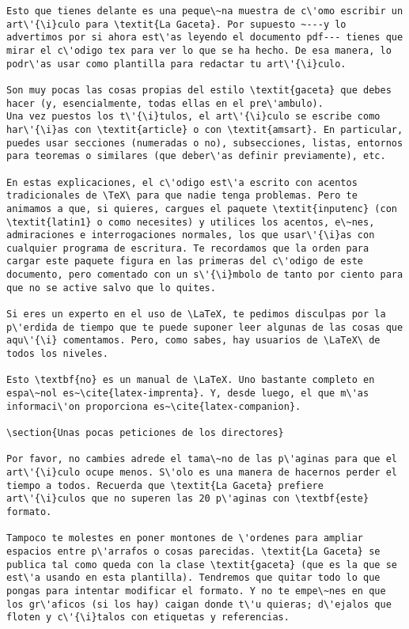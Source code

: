 \documentclass[11pt, a4paper]{article}
\begin{document}
\begin{lstlisting}
Esto que tienes delante es una peque\~na muestra de c\'omo escribir un art\'{\i}culo para \textit{La Gaceta}. Por supuesto ~---y lo advertimos por si ahora est\'as leyendo el documento pdf--- tienes que mirar el c\'odigo tex para ver lo que se ha hecho. De esa manera, lo podr\'as usar como plantilla para redactar tu art\'{\i}culo.

Son muy pocas las cosas propias del estilo \textit{gaceta} que debes hacer (y, esencialmente, todas ellas en el pre\'ambulo).
Una vez puestos los t\'{\i}tulos, el art\'{\i}culo se escribe como har\'{\i}as con \textit{article} o con \textit{amsart}. En particular, puedes usar secciones (numeradas o no), subsecciones, listas, entornos para teoremas o similares (que deber\'as definir previamente), etc.

En estas explicaciones, el c\'odigo est\'a escrito con acentos tradicionales de \TeX\ para que nadie tenga problemas. Pero te animamos a que, si quieres, cargues el paquete \textit{inputenc} (con \textit{latin1} o como necesites) y utilices los acentos, e\~nes, admiraciones e interrogaciones normales, los que usar\'{\i}as con cualquier programa de escritura. Te recordamos que la orden para cargar este paquete figura en las primeras del c\'odigo de este documento, pero comentado con un s\'{\i}mbolo de tanto por ciento para que no se active salvo que lo quites.

Si eres un experto en el uso de \LaTeX, te pedimos disculpas por la p\'erdida de tiempo que te puede suponer leer algunas de las cosas que aqu\'{\i} comentamos. Pero, como sabes, hay usuarios de \LaTeX\ de todos los niveles.

Esto \textbf{no} es un manual de \LaTeX. Uno bastante completo en espa\~nol es~\cite{latex-imprenta}. Y, desde luego, el que m\'as informaci\'on proporciona es~\cite{latex-companion}.

\section{Unas pocas peticiones de los directores}

Por favor, no cambies adrede el tama\~no de las p\'aginas para que el art\'{\i}culo ocupe menos. S\'olo es una manera de hacernos perder el tiempo a todos. Recuerda que \textit{La Gaceta} prefiere art\'{\i}culos que no superen las 20 p\'aginas con \textbf{este} formato.

Tampoco te molestes en poner montones de \'ordenes para ampliar espacios entre p\'arrafos o cosas parecidas. \textit{La Gaceta} se publica tal como queda con la clase \textit{gaceta} (que es la que se est\'a usando en esta plantilla). Tendremos que quitar todo lo que pongas para intentar modificar el formato. Y no te empe\~nes en que los gr\'aficos (si los hay) caigan donde t\'u quieras; d\'ejalos que floten y c\'{\i}talos con etiquetas y referencias.


\end{lstlisting}
\end{document}
